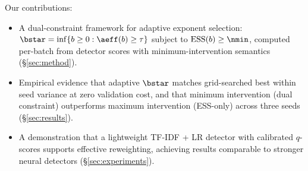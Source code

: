 Our contributions:
\begin{itemize}[nosep,leftmargin=*]
\item A dual-constraint framework for adaptive exponent selection: $\bstar = \inf\{b \geq 0 : \aeff(b) \geq \tau\}$ subject to $\mathrm{ESS}(b) \geq \nmin$, computed per-batch from detector scores with minimum-intervention semantics (\S\ref{sec:method}).
\item Empirical evidence that adaptive $\bstar$ matches grid-searched best within seed variance at zero validation cost, and that minimum intervention (dual constraint) outperforms maximum intervention (ESS-only) across three seeds (\S\ref{sec:results}).
\item A demonstration that a lightweight TF-IDF + LR detector with calibrated $q$-scores supports effective reweighting, achieving results comparable to stronger neural detectors (\S\ref{sec:experiments}).
\end{itemize}
